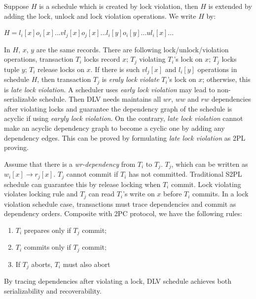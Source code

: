 \documentclass[conference]{IEEEtran}
\begin{document}
Suppose ${H}$ is a schedule which is created by lock violation, then ${H}$ is extended by adding the lock, unlock and lock violation operations.
We write ${H}$ by:
\begin{center}
  ${H = l_i[x] o_i[x]... vl_j[x] o_j[x]...  l_i[y] o_i[y]... ul_i[x] ... }$

\end{center}
In ${H}$, ${x}$, ${y}$ are the same records.
There are following lock/unlock/violation operations,
transaction ${T_i}$ locks record ${x}$;
${T_j}$ violating  ${T_i}$'s lock on ${x}$;
${T_j}$ locks tuple ${y}$;
${T_i}$ release locks on ${x}$.
If there is such $vl_j[x]$ and $l_i[y]$ operations in schedule ${H}$,
then transaction ${T_j}$ is \emph{eraly lock violate} ${T_i}$'s lock on ${x}$;
otherwise, this is \emph{late lock violation}.
A scheduler uses \emph{early lock violation} may lead to non-serializable schedule.
Then DLV needs maintains all $wr$, $ww$ and $rw$ dependencies after violating locks and guarantee the dependency graph of the schedule is acyclic if using \emph{earyly lock violation}. 
On the contrary, \emph{late lock violation} cannot make an acyclic dependency graph to become a cyclic one by adding any dependency edges.
This can be proved by formulating \emph{late lock violation} as 2PL proving.


Assume that there is a \emph{wr-dependency} from ${T_i}$ to ${T_j}$.
    ${T_j}$, which can be written as ${w_i[x] \rightarrow r_j[x]}$.
${T_j}$ cannot commit if ${T_i}$ has not committed.
Traditional S2PL schedule can guarantee this by release locking when ${T_i}$ commit.
Lock violating violates locking rule and ${T_j}$ can read ${T_i}$'s write on ${x}$ before ${T_i}$ commits.
In a lock violation schedule case, transactions must trace dependencies and commit as dependency orders. 
Composite with 2PC protocol, we have the following rules:

\begin{enumerate}
  \item ${T_i}$ prepares only if ${T_j}$ commit;
  \label{rule:prepare}

  \item  ${T_i}$ commits only if ${T_j}$ commit;
  \label{rule:commit} 
  
  \item If ${T_j}$ aborts, ${T_i}$ must also abort

  \label{rule:abort} 
    \end{enumerate}

By tracing dependencies after violating a lock, DLV schedule achieves both serializability and recoverability.
\end{document}
